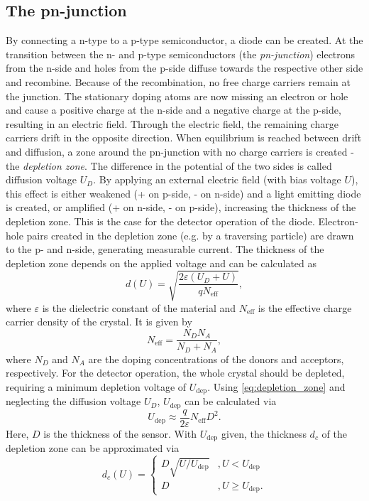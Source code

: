 \subsection{The pn-junction}
By connecting a n-type to a p-type semiconductor, a diode can be created. At the transition between the n- and p-type semiconductors (the \textit{pn-junction}) electrons from the 
n-side and holes from the p-side diffuse towards the respective other side and recombine. Because of the recombination, no free charge carriers remain at the junction.
The stationary doping atoms are now missing an electron or hole and cause a positive charge at the n-side and a negative charge at the p-side, resulting in an electric field.
Through the electric field, the remaining charge carriers drift in the opposite direction. When equilibrium is reached between drift and diffusion, a zone around the pn-junction 
with no charge carriers is created - the \textit{depletion zone}. The difference in the potential of the two sides is called diffusion voltage $U_D$.
By applying an external electric field (with bias voltage $U$), this effect is either weakened (+ on p-side, - on n-side) and a light emitting diode is created, or amplified 
(+ on n-side, - on p-side), increasing the thickness of the depletion zone. This is the case for the detector operation of the diode. Electron-hole pairs created in the
depletion zone (e.g. by a traversing particle) are drawn to the p- and n-side, generating measurable current.
The thickness of the depletion zone depends on the applied voltage and can be calculated as 
\begin{equation}
    d(U) = \sqrt{\frac{2\varepsilon (U_D + U)}{qN_\text{eff}}},
    \label{eq:depletion_zone}
\end{equation}
where $\varepsilon$ is the dielectric constant of the material and $N_\text{eff}$ is the effective charge carrier density of the crystal.
It is given by 
\begin{equation}
    N_\text{eff} = \frac{N_D N_A}{N_D + N_A},
    \label{eq:N_eff}
\end{equation}
where $N_D$ and $N_A$ are the doping concentrations of the donors and acceptors, respectively.
For the detector operation, the whole crystal should be depleted, requiring a minimum depletion voltage of $U_\text{dep}$. Using \autoref{eq:depletion_zone} and neglecting 
the diffusion voltage $U_D$, $U_\text{dep}$ can be calculated via
\begin{equation}
    U_\text{dep} \approx \frac{q}{2\varepsilon} N_\text{eff} D^2.
    \label{eq:U_dep}
\end{equation}
Here, $D$ is the thickness of the sensor.
With $U_\text{dep}$ given, the thickness $d_c$ of the depletion zone can be approximated via 
\begin{equation}
    d_c(U) = 
    \begin{cases}
        D \sqrt{U/U_\text{dep}} & , U<U_\text{dep} \\
        D & , U \geq U_\text{dep}.
    \end{cases}
\end{equation}

